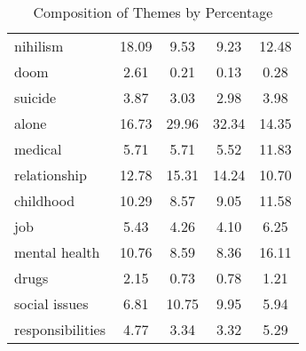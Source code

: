 \documentclass[../report.tex]{subfiles}
\begin{document}
\begin{table*}[ht]
\begin{tabular}{| l | c | c | c | c |}
    \multicolumn{1}{|p{4cm}|}{nihilism} &               18.09 &                 9.53 &                 9.23 &             12.48 \\
           \multicolumn{1}{|p{4cm}|}{doom} &                2.61 &                 0.21 &                 0.13 &              0.28 \\
        \multicolumn{1}{|p{4cm}|}{suicide} &                3.87 &                 3.03 &                 2.98 &              3.98 \\
          \multicolumn{1}{|p{4cm}|}{alone} &               16.73 &                29.96 &                32.34 &             14.35 \\
        \multicolumn{1}{|p{4cm}|}{medical} &                5.71 &                 5.71 &                 5.52 &             11.83 \\
   \multicolumn{1}{|p{4cm}|}{relationship} &               12.78 &                15.31 &                14.24 &             10.70 \\
      \multicolumn{1}{|p{4cm}|}{childhood} &               10.29 &                 8.57 &                 9.05 &             11.58 \\
            \multicolumn{1}{|p{4cm}|}{job} &                5.43 &                 4.26 &                 4.10 &              6.25 \\
  \multicolumn{1}{|p{4cm}|}{mental health} &               10.76 &                 8.59 &                 8.36 &             16.11 \\	           \multicolumn{1}{|p{4cm}|}{drugs} &                2.15 &                 0.73 &                 0.78 &              1.21 \\
  \multicolumn{1}{|p{4cm}|}{social issues} &                6.81 &                10.75 &                 9.95 &              5.94 \\
\multicolumn{1}{|p{4cm}|}{responsibilities} &                4.77 &                 3.34 &                 3.32 &              5.29 \\
			\bottomrule
		\end{tabular}
		\caption{Composition of Themes by Percentage}
		\label{tab:composition}
\end{table*}
\end{document}
